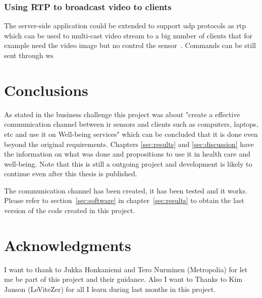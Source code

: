 \documentclass[hidelinks,11pt,a4paper,oneside,article]{memoir}
\begin{document}
\subsection{Using RTP to broadcast video to clients}
The server-side application could be extended to support \gls{udp} protocols as \gls{rtp} which can be used to multi-cast video stream to a big number of clients that for example need the video image but no control the sensor~\cite[298]{hardy2013networks}. Commands can be still sent through \gls{ws} 

\clearpage\chapter{Conclusions}
As stated in the business challenge this project was about "create a effective communication channel between ir sensors and clients such as computers, laptops, etc and use it on Well-being services" which can be concluded that it is done even beyond the original requirements. Chapters \ref{sec:results} and \ref{sec:discussion} have the information on what was done and propositions to use it in health care and well-being. Note that this is still a outgoing project and development is likely to continue even after this thesis is published.

The communication channel has been created, it has been tested and  it works. Please refer to section~\ref{sec:software} in chapter~\ref{sec:results} to obtain the last version of the code created in this project.

\clearpage\chapter{Acknowledgments}
I want to thank to Jukka Honkaniemi and Tero Nurminen (Metropolia) for let me be part of this project and their guidance. Also I want to Thanks to Kim Janson (LeViteZer) for all I learn during last months in this project.




\clearpage{}
\begin{flushleft}
\begin{singlespacing}

\end{singlespacing}
\end{flushleft}
\end{document}
